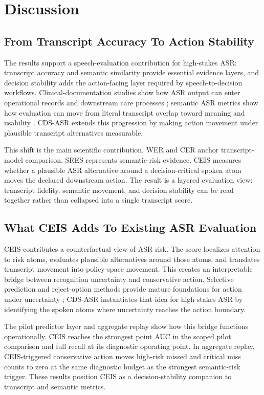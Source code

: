 \section{Discussion}

\subsection{From Transcript Accuracy To Action Stability}

The results support a speech-evaluation contribution for high-stakes ASR: transcript accuracy and semantic similarity provide essential evidence layers, and decision stability adds the action-facing layer required by speech-to-decision workflows. Clinical-documentation studies show how ASR output can enter operational records and downstream care processes \citep{hodgson2016risks,blackley2019speech}; semantic ASR metrics show how evaluation can move from literal transcript overlap toward meaning and usability \citep{roy2021semantic,kim2022semdist}. CDS-ASR extends this progression by making action movement under plausible transcript alternatives measurable.

This shift is the main scientific contribution. WER and CER anchor transcript-model comparison. SRES represents semantic-risk evidence. CEIS measures whether a plausible ASR alternative around a decision-critical spoken atom moves the declared downstream action. The result is a layered evaluation view: transcript fidelity, semantic movement, and decision stability can be read together rather than collapsed into a single transcript score.

\subsection{What CEIS Adds To Existing ASR Evaluation}

CEIS contributes a counterfactual view of ASR risk. The score localizes attention to risk atoms, evaluates plausible alternatives around those atoms, and translates transcript movement into policy-space movement. This creates an interpretable bridge between recognition uncertainty and conservative action. Selective prediction and reject-option methods provide mature foundations for action under uncertainty \citep{chow1970reject,angelopoulos2021conformal}; CDS-ASR instantiates that idea for high-stakes ASR by identifying the spoken atoms where uncertainty reaches the action boundary.

The pilot predictor layer and aggregate replay show how this bridge functions operationally. CEIS reaches the strongest point AUC in the scoped pilot comparison and full recall at its diagnostic operating point. In aggregate replay, CEIS-triggered conservative action moves high-risk missed and critical miss counts to zero at the same diagnostic budget as the strongest semantic-risk trigger. These results position CEIS as a decision-stability companion to transcript and semantic metrics.

